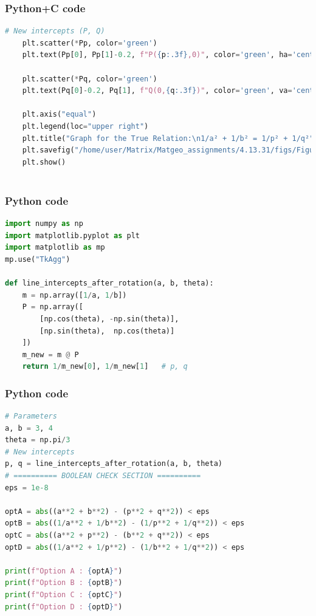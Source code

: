 \documentclass{beamer}
\begin{document}
\begin{frame}[fragile]
    \frametitle{Python+C code}

    \begin{lstlisting}[language=Python]
  # New intercepts (P, Q)
    plt.scatter(*Pp, color='green')
    plt.text(Pp[0], Pp[1]-0.2, f"P({p:.3f},0)", color='green', ha='center', fontsize=10)

    plt.scatter(*Pq, color='green')
    plt.text(Pq[0]-0.2, Pq[1], f"Q(0,{q:.3f})", color='green', va='center', fontsize=10)

    plt.axis("equal")
    plt.legend(loc="upper right")
    plt.title("Graph for the True Relation:\n1/a² + 1/b² = 1/p² + 1/q²")
    plt.savefig("/home/user/Matrix/Matgeo_assignments/4.13.31/figs/Figure_1")
    plt.show()



    \end{lstlisting}
    
\end{frame}



\begin{frame}[fragile]
    \frametitle{Python code}

    \begin{lstlisting}[language=Python]
import numpy as np
import matplotlib.pyplot as plt
import matplotlib as mp
mp.use("TkAgg")

def line_intercepts_after_rotation(a, b, theta):
    m = np.array([1/a, 1/b])
    P = np.array([
        [np.cos(theta), -np.sin(theta)],
        [np.sin(theta),  np.cos(theta)]
    ])
    m_new = m @ P
    return 1/m_new[0], 1/m_new[1]   # p, q

    \end{lstlisting}
    
\end{frame}

\begin{frame}[fragile]
    \frametitle{Python code}

    \begin{lstlisting}[language=Python]
# Parameters
a, b = 3, 4
theta = np.pi/3
# New intercepts
p, q = line_intercepts_after_rotation(a, b, theta)
# ========== BOOLEAN CHECK SECTION ==========
eps = 1e-8

optA = abs((a**2 + b**2) - (p**2 + q**2)) < eps
optB = abs((1/a**2 + 1/b**2) - (1/p**2 + 1/q**2)) < eps
optC = abs((a**2 + p**2) - (b**2 + q**2)) < eps
optD = abs((1/a**2 + 1/p**2) - (1/b**2 + 1/q**2)) < eps

print(f"Option A : {optA}")
print(f"Option B : {optB}")
print(f"Option C : {optC}")
print(f"Option D : {optD}")
    \end{lstlisting}
    
\end{frame}
\end{document}
